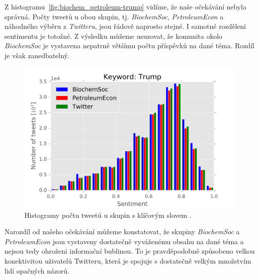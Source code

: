 \documentclass[12pt, a4paper]{article}
\numberwithin{equation}{section} 	%
\begin{document}
Z histogramu~\autoref{fig:biochem_petroleum-trump} vidíme, že naše očekávání nebyla správná. Počty tweetů u obou skupin, tj. \textit{BiochemSoc}, \textit{PetroleumEcon} a náhodného výběru z \textit{Twitteru}, jsou řádově naprosto stejné. I samotné rozdělení sentimentu je totožné. Z výsledku můžeme usuzovat, že komunita okolo \textit{BiochemSoc} je vystavena nepatrně většímu počtu příspěvků na dané téma. Rozdíl je však zanedbatelný.
\begin{figure}[h]
\centering
\includegraphics[scale=0.5]{./Pics/biochem_petroleum-trump.png}
\caption{Histogramy počtu tweetů u skupin s klíčovým slovem \textit{}.}
\label{fig:biochem_petroleum-trump}
\end{figure}

Narozdíl od našeho očekávání můžeme konstatovat, že skupiny \textit{BiochemSoc} a \textit{PetroleumEcon} jsou vystaveny dostatečně vyváženému obsahu na dané téma a nejsou tedy ohroženi informační bublinou. To je pravděpodobně způsobeno velkou konektivitou uživatelů Twitteru, která je spojuje s dostatečně velkým množstvím lidí opačných názorů.
\end{document}
